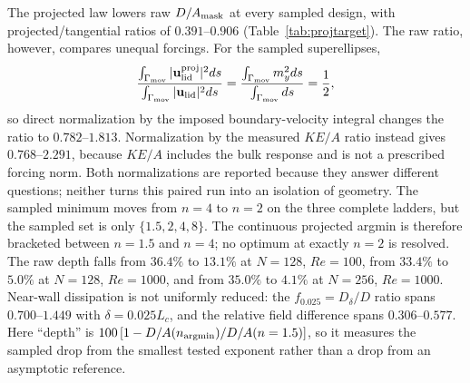 \documentclass[11pt]{article}
\begin{document}
\color{revblue}The projected law lowers raw $D/A_{\rm mask}$ at every sampled design, with
\color{black}
\color{revblue}projected/tangential ratios of $0.391$--$0.906$ (Table~\ref{tab:projtarget}).
\color{black}
\color{revblue}The raw ratio, however, compares unequal forcings. For the sampled
\color{black}
\color{revblue}superellipses,
\color{black}
\[
  \frac{\int_{\Gamma_{\rm mov}}|\mathbf{u}_{\rm lid}^{\rm proj}|^2ds}
       {\int_{\Gamma_{\rm mov}}|\mathbf{u}_{\rm lid}|^2ds}
  =\frac{\int_{\Gamma_{\rm mov}}m_y^2ds}{\int_{\Gamma_{\rm mov}}ds}
  =\frac12 ,
\]
\color{revblue}so direct normalization by the imposed boundary-velocity integral changes the
\color{black}
\color{revblue}ratio to $0.782$--$1.813$. Normalization by the measured $KE/A$ ratio instead
\color{black}
\color{revblue}gives $0.768$--$2.291$, because $KE/A$ includes the bulk response and is not a
\color{black}
\color{revblue}prescribed forcing norm. Both normalizations are reported because they answer
\color{black}
\color{revblue}different questions; neither turns this paired run into an isolation of
\color{black}
\color{revblue}geometry. The sampled minimum moves from $n=4$ to $n=2$ on the three complete
\color{black}
\color{revblue}ladders, but the sampled set is only $\{1.5,2,4,8\}$. The continuous projected
\color{black}
\color{revblue}argmin is therefore bracketed between $n=1.5$ and $n=4$; no optimum at exactly
\color{black}
\color{revblue}$n=2$ is resolved. The raw depth falls from $36.4\%$ to $13.1\%$ at $N=128$,
\color{black}
\color{revblue}$Re=100$, from $33.4\%$ to $5.0\%$ at $N=128$, $Re=1000$, and from $35.0\%$ to
\color{black}
\color{revblue}$4.1\%$ at $N=256$, $Re=1000$. Near-wall dissipation is not uniformly reduced:
\color{black}
\color{revblue}the $f_{0.025}=D_\delta/D$ ratio spans $0.700$--$1.449$ with
\color{black}
\color{revblue}$\delta=0.025L_c$, and the relative field difference spans $0.306$--$0.577$.
\color{black}
\color{revblue}Here ``depth'' is
\color{black}
\color{revblue}$100\,[1-D/A(n_{\rm argmin})/D/A(n=1.5)]$, so it measures the sampled drop
\color{black}
\color{revblue}from the smallest tested exponent rather than a drop from an asymptotic
\color{black}
\color{revblue}reference.
\color{black}
\end{document}
